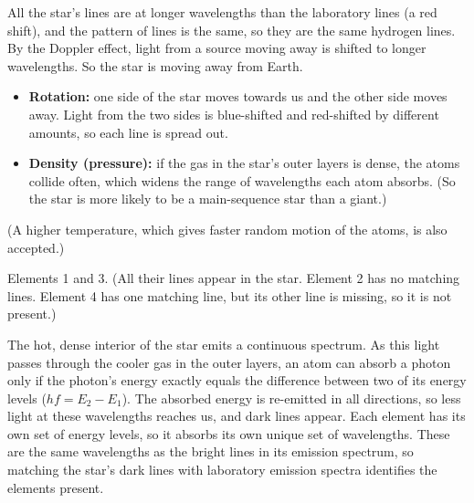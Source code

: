 \documentclass[12pt]{article}
\begin{document}
\ansq
{}
\begin{crit}
\end{crit}
\sample
All the star's lines are at longer wavelengths than the laboratory lines (a red shift), and the pattern of
lines is the same, so they are the same hydrogen lines. By the Doppler effect, light from a source moving
away is shifted to longer wavelengths. So the star is moving away from Earth.
\begin{crit}
\end{crit}
\sample
\begin{itemize}
  \item \textbf{Rotation:} one side of the star moves towards us and the other side moves away. Light from
        the two sides is blue-shifted and red-shifted by different amounts, so each line is spread out.
  \item \textbf{Density (pressure):} if the gas in the star's outer layers is dense, the atoms collide
        often, which widens the range of wavelengths each atom absorbs. (So the star is more likely to be a
        main-sequence star than a giant.)
\end{itemize}
(A higher temperature, which gives faster random motion of the atoms, is also accepted.)

\ansq
{}
\begin{crit}
\end{crit}
\sample
Elements 1 and 3. (All their lines appear in the star. Element 2 has no matching lines. Element 4 has one
matching line, but its other line is missing, so it is not present.)
\begin{crit}
\end{crit}
\sample
The hot, dense interior of the star emits a continuous spectrum. As this light passes through the cooler
gas in the outer layers, an atom can absorb a photon only if the photon's energy exactly equals the
difference between two of its energy levels ($hf = E_2 - E_1$). The absorbed energy is re-emitted in all
directions, so less light at these wavelengths reaches us, and dark lines appear. Each element has its own
set of energy levels, so it absorbs its own unique set of wavelengths. These are the same wavelengths as
the bright lines in its emission spectrum, so matching the star's dark lines with laboratory emission
spectra identifies the elements present.
\end{document}
